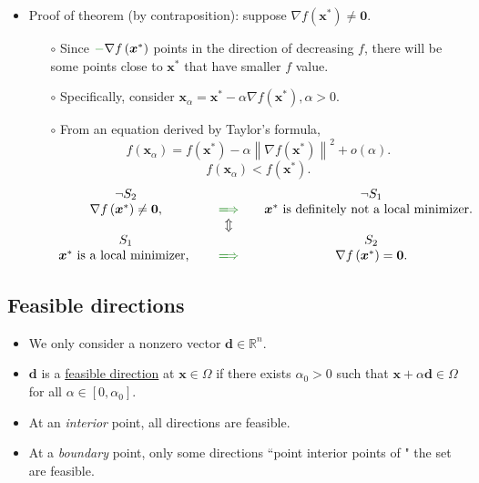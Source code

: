 \documentclass[12pt,thmsa]{article}
\begin{document}
\begin{itemize}
	\item Proof of theorem (by contraposition): suppose \(\nabla f\left(\boldsymbol{x}^{*}\right) \neq \mathbf{0}\).
	
	\begin{itemize}
		\item[\(\circ\)] Since \( {\color{forestgreen}-} \nabla f\left(\boldsymbol{x}^{*}\right)\) points in the direction of {\color{forestgreen}decreasing} \(f\), there will be some points close to \(\boldsymbol{x}^{*}\) that have smaller \(f\) value.
		
		\item[\(\circ\)] Specifically, consider \(\boldsymbol{x}_{\alpha}=\boldsymbol{x}^{*}-\alpha \nabla f\left(\boldsymbol{x}^{*}\right), \alpha>0\).
		
		\item[\(\circ\)] From an equation derived by Taylor's formula,
		\[
		f\left(\boldsymbol{x}_{\alpha}\right)=f\left(\boldsymbol{x}^{*}\right)-\alpha\left\|\nabla f\left(\boldsymbol{x}^{*}\right)\right\|^{2}+o(\alpha) .
		\]
		\[f\left(\boldsymbol{x}_{\alpha}\right)<f\left(\boldsymbol{x}^{*}\right).\]
		\[ \begin{array}{ccccc}
			\neg S_{2} & & & & \neg S_{1} \\
			\nabla f\left(\boldsymbol{x}^{*}\right) \neq \mathbf{0}, & & {\color{forestgreen}\xLongrightarrow{}}  & & \boldsymbol{x}^* \text{  is definitely not a local minimizer. } \\
			& &  \Updownarrow & & \\
			S_{1} & & & & S_{2} \\
			\boldsymbol{x}^* \text{  is a local minimizer, }  & & {\color{forestgreen}\xLongrightarrow{}}  & & \nabla f\left(\boldsymbol{x}^{*}\right) = \mathbf{0} . \\
		\end{array}
		\]
	\end{itemize}
	
\end{itemize}


\subsection{Feasible directions}
\begin{itemize}
	\item We only consider a nonzero vector \(\boldsymbol{d} \in \mathbb{R}^{n}\).
	
	\item \(\boldsymbol{d}\) is a \underline{feasible direction} at \(\boldsymbol{x} \in \Omega\) if there exists \(\alpha_{0}>0\) such that \(\boldsymbol{x}+\alpha \boldsymbol{d} \in \Omega\) for all \(\alpha \in\left[0, \alpha_{0}\right]\).
	
	\item At an \textit{interior} point, all directions are feasible.
	
	\item At a \textit{boundary} point, only some directions ``point interior points of " the set are feasible. 
	
\end{itemize}
\end{document}
